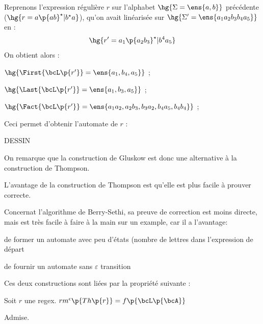     \begin{example}{}{}
        Reprenons l'expression régulière $r$ sur l'alphabet $\hg{\Sigma = \ens{a, b}}$ précédente ($\hg{r = a\p{ab}^\star \vert b^\star a}$), qu'on avait linéarisée sur $\hg{\Sigma' = \ens{a_1a_2b_3b_4a_5}}$ en :
        \[ \hg{r' = a_1\p{a_2b_3}^\star \vert b^4a_5 } \]
        On obtient alors :
        \begin{enumerate}
            \itt $\hg{\First{\bcL\p{r'}} = \ens{a_1, b_4, a_5}}$ ;
            
            \itt $\hg{\Last{\bcL\p{r'}} = \ens{a_1, b_3, a_5}}$ ;
            
            \itt $\hg{\Fact{\bcL\p{r'}} = \ens{a_1a_2, a_2b_3, b_3a_2, b_4a_5, b_4b_4}}$ ;
        \end{enumerate}
        Ceci permet d'obtenir l'automate de $r$ :
        \begin{center}
            DESSIN
        \end{center}
    \end{example}
    
    On remarque que la construction de Gluskow est donc une alternative à la 
    construction de Thompson. 
    \begin{enumerate}
        \itt L'avantage de la construction de Thompson est qu'elle est plus facile à prouver correcte. 
        
        
        \itt Concernat l'algorithme de Berry-Sethi, sa preuve de correction est moins directe, mais est très facile à faire à la main sur un example, car il a l'avantage: 
        
        \itt    de former un automate avec peu d'états (nombre de lettres dans l'expression de départ
        
        \itt    de fournir un automate sans $\varepsilon$ transition 
    
    \end{enumerate}
    
    
    
    Ces deux constructions sont liées par la propriété suivante :
    
    
    
    \begin{property}{}{}
        Soit $r$ une regex. $rm^\epsilon \p{Th\p{r}} = f\p{\bcL\p{\bcA}}$
    \end{property}
    
    \begin{nproof}
        Admise.
    \end{nproof}
    
